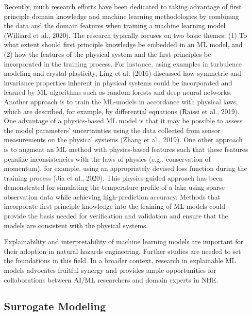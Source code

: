 Recently, much research efforts have been dedicated to taking advantage of first principle domain knowledge and machine learning methodologies by combining the data and the domain features when training a machine learning model (Williard et al., 2020). The research typically focuses on two basic themes: (1) To what extent should first principle knowledge be embedded in an ML model, and (2) how the features of the physical system and the first principles be incorporated in the training process. For instance, using examples in turbulence modeling and crystal plasticity, Ling et al. (2016) discussed how symmetric and invariance properties inherent in physical systems could be incorporated and learned by ML algorithms such as random forests and deep neural networks. Another approach is to train the ML-models in accordance with physical laws, which are described, for example, by differential equations (Raissi et al., 2019). One advantage of a physics-based ML model is that it may be possible to assess the model parameters' uncertainties using the data collected from sensor measurements on the physical systems (Zhang et al., 2019). One other approach is to augment an ML method with physics-based features such that these features penalize inconsistencies with the laws of physics (e.g., conservation of momentum), for example, using an appropriately devised loss function during the training process (Jia et al., 2020). This physics-guided approach has been demonstrated for simulating the temperature profile of a lake using sparse observation data while achieving high-prediction accuracy. Methods that incorporate first principle knowledge into the training of ML models could provide the basis needed for verification and validation and ensure that the models are consistent with the physical systems. 

Explainability and interpretability of machine learning models are important for their adoption in natural hazards engineering. Further studies are needed to set the foundations in this field. In a broader context, research in explainable ML models advocates fruitful synergy and provides ample opportunities for collaborations between AI/ML researchers and domain experts in NHE.

\subsection{Surrogate Modeling}


